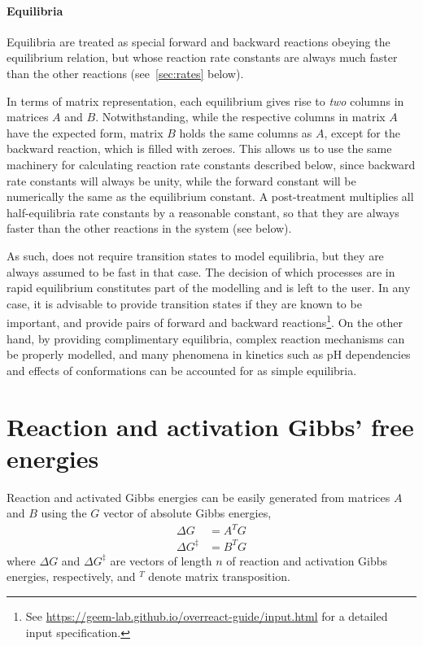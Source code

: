 \paragraph{Equilibria}

Equilibria are treated as special forward and backward reactions obeying the equilibrium relation,
but whose reaction rate constants are always much faster than the other reactions (see~\cref{sec:rates} below).

In terms of matrix representation,
each equilibrium gives rise to \emph{two} columns in matrices $A$ and $B$.
Notwithstanding,
while the respective columns in matrix $A$ have the expected form,
matrix $B$ holds the same columns as $A$,
except for the backward reaction,
which is filled with zeroes.
This allows us to use the same machinery for calculating reaction rate constants described below,
since backward rate constants will always be unity,
while the forward constant will be numerically the same as the equilibrium constant.
A post-treatment multiplies all half-equilibria rate constants by a reasonable constant,
so that they are always faster than the other reactions in the system (see below).

As such,
\overreact does not require transition states to model equilibria,
but they are always assumed to be fast in that case.
The decision of which processes are in rapid equilibrium constitutes part of the modelling and is left to the user.
In any case,
it is advisable to provide transition states if they are known to be important,
and provide pairs of forward and backward reactions\footnote{See \url{https://geem-lab.github.io/overreact-guide/input.html} for a detailed input specification.}.
On the other hand,
by providing complimentary equilibria,
complex reaction mechanisms can be properly modelled,
and many phenomena in kinetics such as pH dependencies and effects of conformations can be accounted for as simple equilibria.

\section{Reaction and activation Gibbs' free energies}

Reaction and activated Gibbs energies can be easily generated from matrices $A$ and $B$ using the $G$ vector of absolute Gibbs energies,
% 
\begin{equation}
	\begin{split}
		\Delta G &= A^T G \\
		\Delta G^\ddagger &= B^T G
	\end{split}
\end{equation}
% 
where $\Delta G$ and $\Delta G^\ddagger$ are vectors of length $n$ of reaction and activation Gibbs energies,
respectively,
and $^T$ denote matrix transposition.

